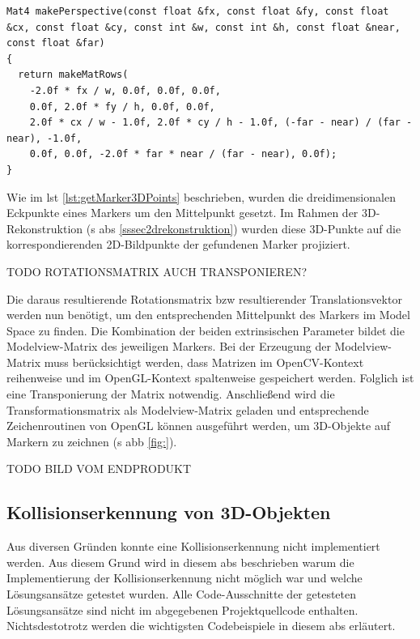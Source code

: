 \begin{lstlisting}[caption={Die Funktion \texttt{algebra.cpp/makePerspective();}, die anhand von intrinsischen Parametern eine perspektivische Projektionsmatrix im OpenGL-Kontext erzeugt}, label={lst:makePerspective}]
Mat4 makePerspective(const float &fx, const float &fy, const float &cx, const float &cy, const int &w, const int &h, const float &near, const float &far)
{
  return makeMatRows(
    -2.0f * fx / w, 0.0f, 0.0f, 0.0f,
    0.0f, 2.0f * fy / h, 0.0f, 0.0f,
    2.0f * cx / w - 1.0f, 2.0f * cy / h - 1.0f, (-far - near) / (far - near), -1.0f,
    0.0f, 0.0f, -2.0f * far * near / (far - near), 0.0f);
}
\end{lstlisting}

\noindent Wie im \acs{lst} \ref{lst:getMarker3DPoints} beschrieben, wurden die dreidimensionalen Eckpunkte eines Markers um den Mittelpunkt gesetzt. Im Rahmen der 3D-Rekonstruktion (\acs{s} \acs{abs} \ref{sssec2drekonstruktion}) wurden diese 3D-Punkte auf die korrespondierenden 2D-Bildpunkte der gefundenen Marker projiziert.

TODO ROTATIONSMATRIX AUCH TRANSPONIEREN?

Die daraus resultierende Rotationsmatrix \acs{bzw} resultierender Translationsvektor werden nun benötigt, um den entsprechenden Mittelpunkt des Markers im Model Space zu finden. Die Kombination der beiden extrinsischen Parameter bildet die Modelview-Matrix des jeweiligen Markers. Bei der Erzeugung der Modelview-Matrix muss berücksichtigt werden, dass Matrizen im OpenCV-Kontext reihenweise und im OpenGL-Kontext spaltenweise gespeichert werden. Folglich ist eine Transponierung der Matrix notwendig. Anschließend wird die Transformationsmatrix als Modelview-Matrix geladen und entsprechende Zeichenroutinen von OpenGL können ausgeführt werden, um 3D-Objekte auf Markern zu zeichnen (\acs{s} \acs{abb} \ref{fig:}).

TODO BILD VOM ENDPRODUKT

\subsection{Kollisionserkennung von 3D-Objekten}\label{kollitionerkennungnnnn}
Aus diversen Gründen konnte eine Kollisionserkennung nicht implementiert werden. Aus diesem Grund wird in diesem \acs{abs} beschrieben warum die Implementierung der Kollisionserkennung nicht möglich war und welche Lösungsansätze getestet wurden. Alle Code-Ausschnitte der getesteten Lösungsansätze sind nicht im abgegebenen Projektquellcode enthalten. Nichtsdestotrotz werden die wichtigsten Codebeispiele in diesem \acs{abs} erläutert.


